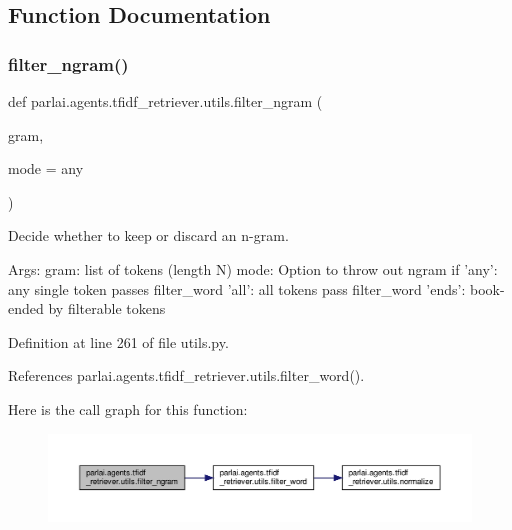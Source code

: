 \subsection{Function Documentation}
\mbox{\label{namespaceparlai_1_1agents_1_1tfidf__retriever_1_1utils_a791c829884544e127e480a52d233d521}} 
\subsubsection{\texorpdfstring{filter\+\_\+ngram()}{filter\_ngram()}}
{\footnotesize\ttfamily def parlai.\+agents.\+tfidf\+\_\+retriever.\+utils.\+filter\+\_\+ngram (\begin{DoxyParamCaption}\item[{}]{gram,  }\item[{}]{mode = {\ttfamily \textquotesingle{}any\textquotesingle{}} }\end{DoxyParamCaption})}

\begin{DoxyVerb}Decide whether to keep or discard an n-gram.

Args:
    gram: list of tokens (length N)
    mode: Option to throw out ngram if
      'any': any single token passes filter_word
      'all': all tokens pass filter_word
      'ends': book-ended by filterable tokens
\end{DoxyVerb}
 

Definition at line 261 of file utils.\+py.



References parlai.\+agents.\+tfidf\+\_\+retriever.\+utils.\+filter\+\_\+word().

Here is the call graph for this function\+:
\nopagebreak
\begin{figure}[H]
\begin{center}
\leavevmode
\includegraphics[width=350pt]{namespaceparlai_1_1agents_1_1tfidf__retriever_1_1utils_a791c829884544e127e480a52d233d521_cgraph}
\end{center}
\end{figure}
\mbox{\label{namespaceparlai_1_1agents_1_1tfidf__retriever_1_1utils_a57608b2b9a61223e39e3cb51f5c9f812}} 
